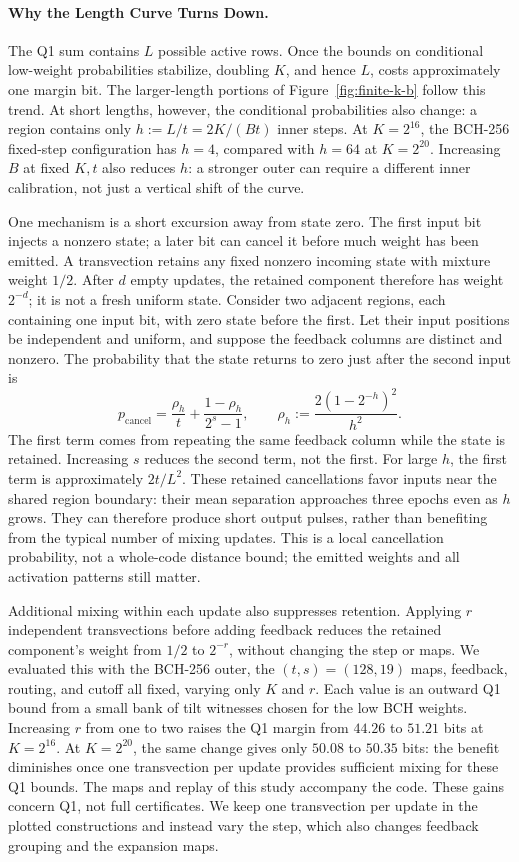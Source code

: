 

\paragraph{Why the Length Curve Turns Down.}
The Q1 sum contains $L$ possible active rows. Once the bounds on conditional
low-weight probabilities stabilize, doubling $K$, and hence $L$, costs
approximately one margin bit. The larger-length portions of
Figure~\ref{fig:finite-k-b} follow this trend. At short lengths, however,
the conditional probabilities also change: a region contains only
$h:=L/t=2K/(Bt)$ inner steps. At $K=2^{16}$, the BCH-256 fixed-step
configuration has $h=4$, compared with $h=64$ at $K=2^{20}$.
Increasing $B$ at fixed $K,t$ also reduces $h$: a stronger outer can
require a different inner calibration, not just a vertical shift of the curve.

One mechanism is a short excursion away from state zero. The first input
bit injects a nonzero state; a later bit can cancel it before much weight
has been emitted. A transvection retains any fixed nonzero incoming state
with mixture weight $1/2$. After $d$ empty updates, the retained component
therefore has weight $2^{-d}$; it is not a fresh uniform state.
Consider two adjacent regions, each containing one input bit, with zero
state before the first. Let their input positions be independent and
uniform, and suppose the feedback columns are distinct and nonzero.
The probability that the state returns to zero just after the second input is
\[
 p_{\mathrm{cancel}}
 =\frac{\rho_h}{t}+\frac{1-\rho_h}{2^s-1},
 \qquad \rho_h:=\frac{2(1-2^{-h})^2}{h^2}.
\]
The first term comes from repeating the same feedback column while the
state is retained. Increasing $s$ reduces the second term, not the first.
For large $h$, the first term is approximately $2t/L^2$.
These retained cancellations favor inputs near the shared region boundary:
their mean separation approaches three epochs even as $h$ grows.
They can therefore produce short output pulses, rather than benefiting
from the typical number of mixing updates.
This is a local cancellation probability, not a whole-code distance bound;
the emitted weights and all activation patterns still matter.

Additional mixing within each update also suppresses retention. Applying
$r$ independent transvections before adding feedback reduces the retained
component's weight from $1/2$ to $2^{-r}$, without changing the step or maps.
We evaluated this with the BCH-256 outer, the $(t,s)=(128,19)$ maps,
feedback, routing, and cutoff all fixed, varying only $K$ and $r$. Each
value is an outward Q1 bound from a small bank of tilt witnesses chosen for
the low BCH weights. Increasing $r$ from one to two raises the Q1 margin
from $44.26$ to $51.21$ bits at $K=2^{16}$. At $K=2^{20}$, the same change
gives only $50.08$ to $50.35$ bits: the benefit diminishes once one
transvection per update provides sufficient mixing for these Q1 bounds.
The maps and replay of this study accompany the code\repositorycite.
These gains concern Q1, not full certificates.
We keep one transvection per update in the plotted constructions and
instead vary the step, which also changes feedback grouping and the
expansion maps.

